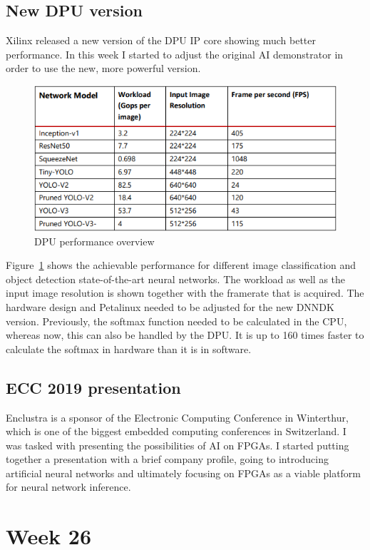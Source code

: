 \subsection{New \ac{DPU} version}
Xilinx released a new version of the \ac{DPU} \ac{IP} core showing much better performance. In this week I started to adjust the original \ac{AI} demonstrator in order to use the new, more powerful version.
\begin{figure}[!htb]
	\centering
		\includegraphics[width=\textwidth]{bilder/dpu_performance.png}
		\caption{\acs{DPU} performance overview \cite{dpu}}
		\label{fig:dpu_performance}
\end{figure}
Figure~\ref{fig:dpu_performance} shows the achievable performance for different image classification and object detection state-of-the-art neural networks. The workload as well as the input image resolution is shown together with the framerate that is acquired.
The hardware design and Petalinux needed to be adjusted for the new \ac{DNNDK} version. Previously, the softmax function needed to be calculated in the \ac{CPU}, whereas now, this can also be handled by the \ac{DPU}. It is up to 160 times faster to calculate the softmax in hardware than it is in software.
\subsection{ECC 2019 presentation}
Enclustra is a sponsor of the Electronic Computing Conference in Winterthur, which is one of the biggest embedded computing conferences in Switzerland. I was tasked with presenting the possibilities of \ac{AI} on \acp{FPGA}. I started putting together a presentation with a brief company profile, going to introducing artificial neural networks and ultimately focusing on \acp{FPGA} as a viable platform for neural network inference.

\section{Week 26}
